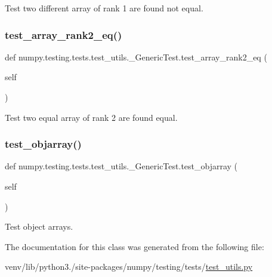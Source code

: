 \begin{DoxyVerb}Test two different array of rank 1 are found not equal.\end{DoxyVerb}
 \mbox{\label{classnumpy_1_1testing_1_1tests_1_1test__utils_1_1__GenericTest_aab5668985eadf2d4251e73331f670331}} 
\subsubsection{\texorpdfstring{test\+\_\+array\+\_\+rank2\+\_\+eq()}{test\_array\_rank2\_eq()}}
{\footnotesize\ttfamily def numpy.\+testing.\+tests.\+test\+\_\+utils.\+\_\+\+Generic\+Test.\+test\+\_\+array\+\_\+rank2\+\_\+eq (\begin{DoxyParamCaption}\item[{}]{self }\end{DoxyParamCaption})}

\begin{DoxyVerb}Test two equal array of rank 2 are found equal.\end{DoxyVerb}
 \mbox{\label{classnumpy_1_1testing_1_1tests_1_1test__utils_1_1__GenericTest_a39ff1438013c7ed56363e911177648d8}} 
\subsubsection{\texorpdfstring{test\+\_\+objarray()}{test\_objarray()}}
{\footnotesize\ttfamily def numpy.\+testing.\+tests.\+test\+\_\+utils.\+\_\+\+Generic\+Test.\+test\+\_\+objarray (\begin{DoxyParamCaption}\item[{}]{self }\end{DoxyParamCaption})}

\begin{DoxyVerb}Test object arrays.\end{DoxyVerb}
 

The documentation for this class was generated from the following file\+:\begin{DoxyCompactItemize}
\item 
venv/lib/python3./site-\/packages/numpy/testing/tests/\hyperlink{numpy_2testing_2tests_2test__utils_8py}{test\+\_\+utils.\+py}\end{DoxyCompactItemize}
